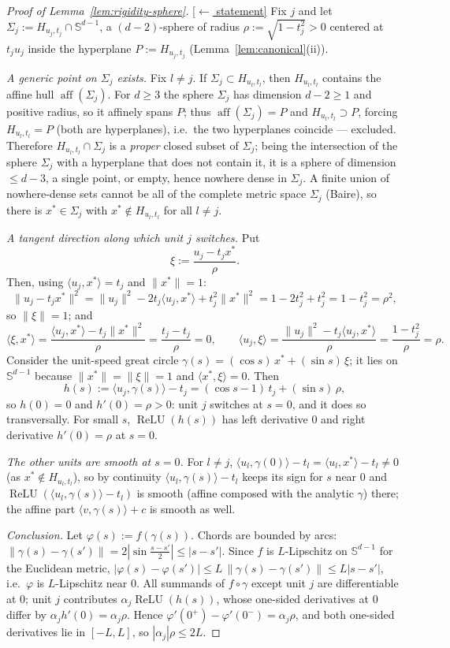\documentclass[11pt,reqno]{amsart}
\theoremstyle{plain}
\theoremstyle{definition}
\theoremstyle{remark}
\newcommand{\Sd}{\mathbb{S}^{d-1}}
\newcommand{\relu}{\operatorname{ReLU}}
\newcommand{\inn}[2]{\langle #1,#2\rangle}
\DeclareMathOperator{\aff}{aff}
\newcommand{\stmtbutton}[1]{\hyperref[#1]{\textnormal{\footnotesize\textsf{[$\leftarrow$ statement]}}}}
\begin{document}
\begin{proof}[Proof of Lemma~\textup{\ref{lem:rigidity-sphere}}]\label{proof:rigidity-sphere}\stmtbutton{lem:rigidity-sphere}
Fix $j$ and let $\Sigma_j:=H_{u_j,t_j}\cap\Sd$, a $(d-2)$-sphere of radius $\rho:=\sqrt{1-t_j^2}>0$ centered at $t_ju_j$ inside the hyperplane $P:=H_{u_j,t_j}$ (Lemma~\ref{lem:canonical}(ii)).

\emph{A generic point on $\Sigma_j$ exists.} Fix $l\ne j$. If $\Sigma_j\subset H_{u_l,t_l}$, then $H_{u_l,t_l}$ contains the affine hull $\aff(\Sigma_j)$. For $d\ge3$ the sphere $\Sigma_j$ has dimension $d-2\ge1$ and positive radius, so it affinely spans $P$; thus $\aff(\Sigma_j)=P$ and $H_{u_l,t_l}\supset P$, forcing $H_{u_l,t_l}=P$ (both are hyperplanes), i.e.\ the two hyperplanes coincide --- excluded. Therefore $H_{u_l,t_l}\cap\Sigma_j$ is a \emph{proper} closed subset of $\Sigma_j$; being the intersection of the sphere $\Sigma_j$ with a hyperplane that does not contain it, it is a sphere of dimension $\le d-3$, a single point, or empty, hence nowhere dense in $\Sigma_j$. A finite union of nowhere-dense sets cannot be all of the complete metric space $\Sigma_j$ (Baire), so there is $x^*\in\Sigma_j$ with $x^*\notin H_{u_l,t_l}$ for all $l\ne j$.

\emph{A tangent direction along which unit $j$ switches.} Put
\[
\xi:=\frac{u_j-t_jx^*}{\rho}.
\]
Then, using $\inn{u_j}{x^*}=t_j$ and $\|x^*\|=1$:
\[
\|u_j-t_jx^*\|^2=\|u_j\|^2-2t_j\inn{u_j}{x^*}+t_j^2\|x^*\|^2=1-2t_j^2+t_j^2=1-t_j^2=\rho^2,
\]
so $\|\xi\|=1$; and
\[
\inn{\xi}{x^*}=\frac{\inn{u_j}{x^*}-t_j\|x^*\|^2}{\rho}=\frac{t_j-t_j}{\rho}=0,\qquad
\inn{u_j}{\xi}=\frac{\|u_j\|^2-t_j\inn{u_j}{x^*}}{\rho}=\frac{1-t_j^2}{\rho}=\rho.
\]
Consider the unit-speed great circle $\gamma(s)=(\cos s)\,x^*+(\sin s)\,\xi$; it lies on $\Sd$ because $\|x^*\|=\|\xi\|=1$ and $\inn{x^*}{\xi}=0$. Then
\[
h(s):=\inn{u_j}{\gamma(s)}-t_j=(\cos s-1)\,t_j+(\sin s)\,\rho,
\]
so $h(0)=0$ and $h'(0)=\rho>0$: unit $j$ switches at $s=0$, and it does so transversally. For small $s$, $\relu(h(s))$ has left derivative $0$ and right derivative $h'(0)=\rho$ at $s=0$.

\emph{The other units are smooth at $s=0$.} For $l\ne j$, $\inn{u_l}{\gamma(0)}-t_l=\inn{u_l}{x^*}-t_l\ne0$ (as $x^*\notin H_{u_l,t_l}$), so by continuity $\inn{u_l}{\gamma(s)}-t_l$ keeps its sign for $s$ near $0$ and $\relu(\inn{u_l}{\gamma(s)}-t_l)$ is smooth (affine composed with the analytic $\gamma$) there; the affine part $\inn{v}{\gamma(s)}+c$ is smooth as well.

\emph{Conclusion.} Let $\varphi(s):=f(\gamma(s))$. Chords are bounded by arcs: $\|\gamma(s)-\gamma(s')\|=2|\sin\tfrac{s-s'}2|\le|s-s'|$. Since $f$ is $L$-Lipschitz on $\Sd$ for the Euclidean metric, $|\varphi(s)-\varphi(s')|\le L\,\|\gamma(s)-\gamma(s')\|\le L|s-s'|$, i.e.\ $\varphi$ is $L$-Lipschitz near $0$. All summands of $f\circ\gamma$ except unit $j$ are differentiable at $0$; unit $j$ contributes $\alpha_j\relu(h(s))$, whose one-sided derivatives at $0$ differ by $\alpha_j h'(0)=\alpha_j\rho$. Hence $\varphi'(0^+)-\varphi'(0^-)=\alpha_j\rho$, and both one-sided derivatives lie in $[-L,L]$, so $|\alpha_j|\rho\le2L$.
\end{proof}
\end{document}
